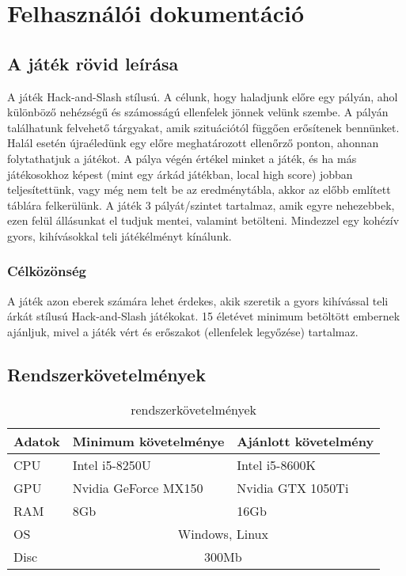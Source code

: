\chapter{Felhasználói dokumentáció} %
\label{ch:user}

\section{A játék rövid leírása}
A játék Hack-and-Slash stílusú. A célunk, hogy haladjunk előre egy pályán, ahol különböző nehézségű és számosságú ellenfelek jönnek velünk szembe. A pályán találhatunk felvehető tárgyakat, amik szituációtól függően erősítenek bennünket. Halál esetén újraéledünk egy előre meghatározott ellenőrző ponton, ahonnan folytathatjuk a játékot. A pálya végén értékel minket a játék, és ha más játékosokhoz képest (mint egy árkád játékban, local high score) jobban teljesítettünk, vagy még nem telt be az eredménytábla, akkor az előbb említett táblára felkerülünk. A játék 3 pályát/szintet tartalmaz, amik egyre nehezebbek, ezen felül állásunkat el tudjuk mentei, valamint betölteni. Mindezzel egy kohézív gyors, kihívásokkal teli játékélményt kínálunk.
\subsection{Célközönség}
A játék azon eberek számára lehet érdekes, akik szeretik a gyors kihívással teli árkát stílusú Hack-and-Slash játékokat. 15 életévet minimum betöltött embernek ajánljuk, mivel a játék vért és erőszakot (ellenfelek legyőzése) tartalmaz.
\newpage
\section{Rendszerkövetelmények}
\begin{table}[htb]
	\centering
	\begin{tabular}{ | m{} | m{} | m{} | }
		\hline
		\textbf{Adatok} & \textbf{Minimum követelménye} & \textbf{Ajánlott követelmény} \\
		\hline \hline
		CPU & Intel i5-8250U & Intel i5-8600K \\ \hline
		GPU & Nvidia GeForce MX150 & Nvidia GTX 1050Ti \\ \hline
		RAM & 8Gb & 16Gb \\ \hline
		OS & \multicolumn{2}{c|}{Windows, Linux} \\
		\hline
		Disc & \multicolumn{2}{c|}{300Mb} \\
		\hline
	\end{tabular}
	\caption{rendszerkövetelmények}
	\label{sysReq}
\end{table}
